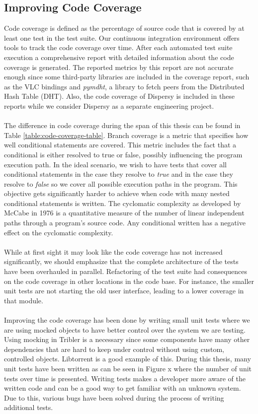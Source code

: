 \subsection{Improving Code Coverage}
Code coverage is defined as the percentage of source code that is covered by at least one test in the test suite. Our continuous integration environment offers tools to track the code coverage over time. After each automated test suite execution a comprehensive report with detailed information about the code coverage is generated. The reported metrics by this report are not accurate enough since some third-party libraries are included in the coverage report, such as the VLC bindings and \emph{pymdht}, a library to fetch peers from the Distributed Hash Table (DHT). Also, the code coverage of Dispersy is included in these reports while we consider Dispersy as a separate engineering project.\\\\
The difference in code coverage during the span of this thesis can be found in Table \ref{table:code-coverage-table}. Branch coverage is a metric that specifies how well conditional statements are covered. This metric includes the fact that a conditional is either resolved to true or false, possibly influencing the program execution path. In the ideal scenario, we wish to have tests that cover all conditional statements in the case they resolve to \emph{true} and in the case they resolve to \emph{false} so we cover all possible execution paths in the program. This objective gets significantly harder to achieve when code with many nested conditional statements is written. The cyclomatic complexity as developed by McCabe in 1976\cite{mccabe1976complexity} is a quantitative measure of the number of linear independent paths through a program's source code. Any conditional written has a negative effect on the cyclomatic complexity.\\\\
While at first sight it may look like the code coverage has not increased significantly, we should emphasize that the complete architecture of the tests have been overhauled in parallel. Refactoring of the test suite had consequences on the code coverage in other locations in the code base. For instance, the smaller unit tests are not starting the old user interface, leading to a lower coverage in that module.\\\\
Improving the code coverage has been done by writing small unit tests where we are using mocked objects to have better control over the system we are testing. Using mocking in Tribler is a necessary since some components have many other dependencies that are hard to keep under control without using custom, controlled objects. Libtorrent is a good example of this. During this thesis, many unit tests have been written as can be seen in Figure x where the number of unit tests over time is presented. Writing tests makes a developer more aware of the written code and can be a good way to get familiar with an unknown system. Due to this, various bugs have been solved during the process of writing additional tests.

